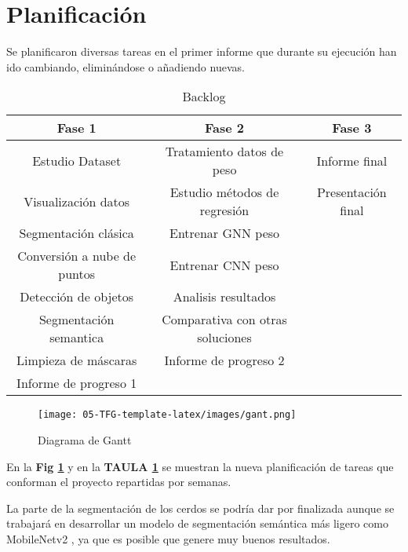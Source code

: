 \documentclass[12pt,a4paper]{article}
\begin{document}
\section{Planificación}

Se planificaron diversas tareas en el primer informe que durante su ejecución han ido cambiando, eliminándose o añadiendo nuevas.

\begin{table}[!]
 \centering
\begin{tabular}{|c|c|c|}
\hline
\textbf{Fase 1}             & \textbf{Fase 2}                  & \textbf{Fase 3}    \\ \hline
Estudio Dataset             & Tratamiento datos de peso        & Informe final      \\
Visualización datos         & Estudio métodos de regresión     & Presentación final \\
Segmentación clásica        & Entrenar GNN peso                &                    \\
Conversión a nube de puntos & Entrenar CNN peso                &                    \\
Detección de  objetos       & Analisis resultados              &                    \\
Segmentación semantica      & Comparativa con otras soluciones &                    \\
Limpieza de máscaras        & Informe de progreso 2            &                    \\
Informe de progreso 1       &                                  &                    \\ \hline
\end{tabular}
\caption{Backlog}
\label{backlog}
\end{table}

\begin{figure}[h]
\centering
\texttt{[image: 05-TFG-template-latex/images/gant.png]}
\caption{Diagrama de Gantt}
\label{gant}
\end{figure}


En la \textbf{Fig \ref{gant}} y en la \textbf{TAULA \ref{backlog}} se muestran la nueva planificación de tareas que conforman el proyecto repartidas por semanas.

La parte de la segmentación de los cerdos se podría dar por finalizada aunque se trabajará en desarrollar un modelo de segmentación semántica más ligero como MobileNetv2 \cite{mobilenet}, ya que es posible que genere muy buenos resultados.
\end{document}
